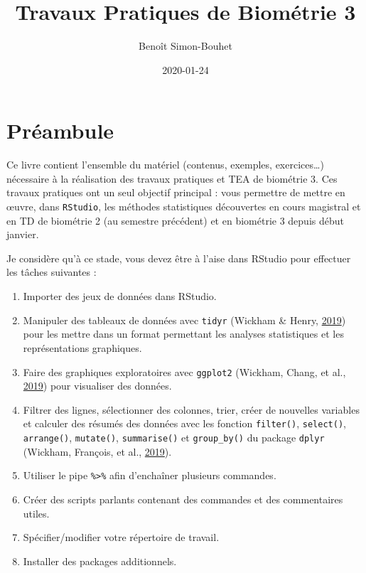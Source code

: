\documentclass[a4paperpaper,]{article}
\title{Travaux Pratiques de Biométrie 3}
\author{Benoît Simon-Bouhet}
\date{2020-01-24}
\providecommand{\tightlist}{%
  \setlength{\itemsep}{0pt}\setlength{\parskip}{0pt}}
\begin{document}
\maketitle

{
\hypersetup{linkcolor=black}
\setcounter{tocdepth}{2}
\tableofcontents
}
\hypertarget{pruxe9ambule}{%
\section{Préambule}\label{pruxe9ambule}}

Ce livre contient l'ensemble du matériel (contenus, exemples, exercices\ldots{}) nécessaire à la réalisation des travaux pratiques et TEA de biométrie 3. Ces travaux pratiques ont un seul objectif principal : vous permettre de mettre en œuvre, dans \texttt{RStudio}, les méthodes statistiques découvertes en cours magistral et en TD de biométrie 2 (au semestre précédent) et en biométrie 3 depuis début janvier.

Je considère qu'à ce stade, vous devez être à l'aise dans RStudio pour effectuer les tâches suivantes :

\begin{enumerate}
\def\labelenumi{\arabic{enumi}.}
\tightlist
\item
  Importer des jeux de données dans RStudio.
\item
  Manipuler des tableaux de données avec \texttt{tidyr} (Wickham \& Henry, \protect\hyperlink{ref-R-tidyr}{2019}) pour les mettre dans un format permettant les analyses statistiques et les représentations graphiques.
\item
  Faire des graphiques exploratoires avec \texttt{ggplot2} (Wickham, Chang, et al., \protect\hyperlink{ref-R-ggplot2}{2019}) pour visualiser des données.
\item
  Filtrer des lignes, sélectionner des colonnes, trier, créer de nouvelles variables et calculer des résumés des données avec les fonction \texttt{filter()}, \texttt{select()}, \texttt{arrange()}, \texttt{mutate()}, \texttt{summarise()} et \texttt{group\_by()} du package \texttt{dplyr} (Wickham, François, et al., \protect\hyperlink{ref-R-dplyr}{2019}).
\item
  Utiliser le pipe \texttt{\%\textgreater{}\%} afin d'enchaîner plusieurs commandes.
\item
  Créer des scripts parlants contenant des commandes et des commentaires utiles.
\item
  Spécifier/modifier votre répertoire de travail.
\item
  Installer des packages additionnels.
\end{enumerate}
\end{document}
